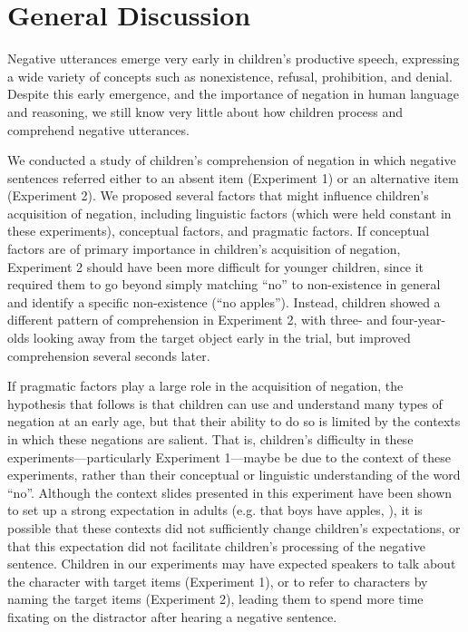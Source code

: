 \documentclass[man]{apa2}
\begin{document}
\section{General Discussion}

Negative utterances emerge very early in children's productive speech, expressing a wide variety of concepts such as nonexistence, refusal, prohibition, and denial.  Despite this early emergence, and the importance of negation in human language and reasoning, we still know very little about how children process and comprehend negative utterances.  

We conducted a study of children's comprehension of negation in which negative sentences referred either to an absent item (Experiment 1) or an alternative item (Experiment 2).  We proposed several factors that might influence children's acquisition of negation, including linguistic factors (which were held constant in these experiments), conceptual factors, and pragmatic factors.  If conceptual factors are of primary importance in children's acquisition of negation, Experiment 2 should have been more difficult for younger children, since it required them to go beyond simply matching ``no'' to non-existence in general and identify a specific non-existence (``no apples'').  Instead, children showed a different pattern of comprehension in Experiment 2, with three- and four-year-olds looking away from the target object early in the trial, but improved comprehension several seconds later.  

If pragmatic factors play a large role in the acquisition of negation, the hypothesis that follows is that children can use and understand many types of negation at an early age, but that their ability to do so is limited by the contexts in which these negations are salient.  That is, children's difficulty in these experiments---particularly Experiment 1---maybe be due to the context of these experiments, rather than their conceptual or linguistic understanding of the word ``no''.   Although the context slides presented in this experiment have been shown to set up a strong expectation in adults (e.g. that boys have apples, ), it is possible that these contexts did not sufficiently change children's expectations, or that this expectation did not facilitate children's processing of the negative sentence.  Children in our experiments may have expected speakers to talk about the character with target items (Experiment 1), or to refer to characters by naming the target items (Experiment 2), leading them to spend more time fixating on the distractor after hearing a negative sentence.
\end{document}
